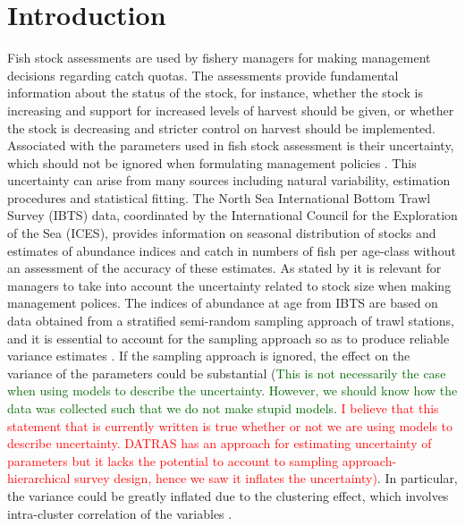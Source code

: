 \documentclass[a4paper 12pt]{article}
\numberwithin{equation}{section}
\newcommand{\ed}[1]{\textcolor{red}{#1}}
\newcommand{\olav}[1]{\textcolor{darkgreen}{#1}}
\begin{document}
\section{Introduction}
Fish stock assessments are used by fishery managers for making management decisions regarding catch quotas. The assessments provide fundamental information about the status of the stock, for instance, whether the stock is increasing and support for increased levels of harvest should be given, or whether the stock is decreasing and stricter control on harvest should be implemented. Associated with the parameters used in fish stock assessment is their uncertainty, which should not be ignored when formulating management policies \citep{ludwig1981measurement, berg2014evaluation}. This uncertainty can arise from many sources including natural variability, estimation procedures and statistical fitting. The North Sea International Bottom Trawl Survey (IBTS) data, coordinated by the International Council for the Exploration of the Sea (ICES), provides information on seasonal distribution of stocks and estimates of abundance indices and catch in numbers of fish per age-class without an assessment of the accuracy of these estimates. As stated by \citet{ludwig1981measurement} it is relevant for managers to take into account the uncertainty related to stock size when making management polices. The indices of abundance at age from IBTS  are based on data obtained from a stratified semi-random sampling approach of trawl stations,  and  it is essential to account for the sampling approach so as to produce reliable variance estimates \citep{lehtonen2004practical}. If the sampling approach is ignored, the effect on the variance  of the parameters could be substantial (\olav{This is not necessarily the case when using models to describe the uncertainty. However, we should know how the data was collected such that we do not make stupid models}. \ed{I believe that this statement that is currently written is true whether or not we are using models to describe uncertainty. DATRAS has an approach for estimating uncertainty of parameters but it lacks the potential to account to sampling approach-hierarchical survey design, hence we saw it inflates the uncertainty)}.  In particular, the variance could be greatly inflated  due to the clustering effect, which involves intra-cluster correlation of the variables \citep{aanes2015efficient, lehtonen2004practical}. 
\end{document}

